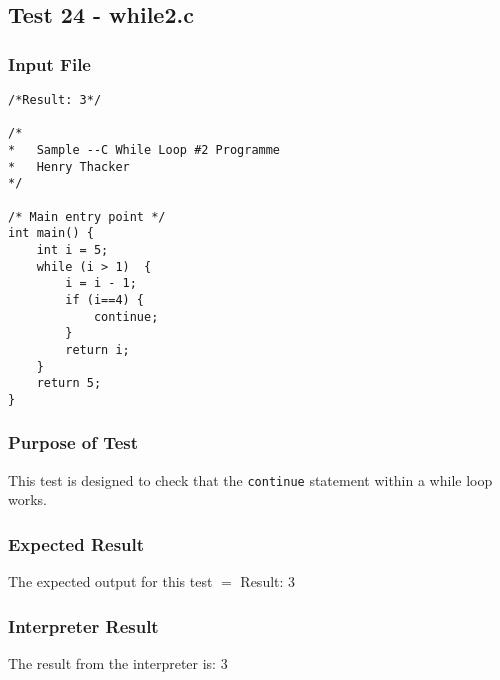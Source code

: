 \subsection{Test 24 - while2.c}
\subsubsection{Input File}
\begin{lstlisting}[showstringspaces=false,breaklines=true,backgroundcolor=\color{light-gray}, captionpos=b]
/*Result: 3*/

/*
*	Sample --C While Loop #2 Programme
*	Henry Thacker
*/

/* Main entry point */
int main() {
	int i = 5;
	while (i > 1)  {
		i = i - 1;
		if (i==4) {
			continue;
		}
		return i;
	}
	return 5;
}
\end{lstlisting}\subsubsection{Purpose of Test}
This test is designed to check that the \verb!continue! statement within a while loop works.

\subsubsection{Expected Result}
The expected output for this test $=$ Result: 3
\subsubsection{Interpreter Result}
The result from the interpreter is: 3
